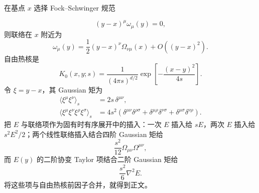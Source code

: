 \begin{derivation}
在基点 $x$ 选择 Fock--Schwinger 规范

\begin{equation*}
 (y-x)^\mu\omega_\mu(y)=0,
\end{equation*}
则联络在 $x$ 附近为
\begin{equation*}
 \omega_\mu(y)
 =\frac12(y-x)^\nu\Omega_{\nu\mu}(x)
 +O((y-x)^2).
\end{equation*}
自由热核是
\begin{equation*}
 K_0(x,y;s)=\frac1{(4\pi s)^{d/2}}
 \exp\!\left[-\frac{(x-y)^2}{4s}\right].
\end{equation*}
令 $\xi=y-x$，其 Gaussian 矩为
\begin{align*}
 \langle\xi^\mu\xi^\nu\rangle_s
 &=2s\,\delta^{\mu\nu},\\
 \langle\xi^\mu\xi^\nu\xi^\rho\xi^\sigma\rangle_s
 &=4s^2(\delta^{\mu\nu}\delta^{\rho\sigma}
 +\delta^{\mu\rho}\delta^{\nu\sigma}
 +\delta^{\mu\sigma}\delta^{\nu\rho}).
\end{align*}
把 $E$ 与联络项作为固有时有序展开中的插入：一次 $E$ 插入给 $sE$，两次 $E$ 插入给 $s^2E^2/2$；两个线性联络插入结合四阶 Gaussian 矩给
\begin{equation*}
 \frac{s^2}{12}\Omega_{\mu\nu}\Omega^{\mu\nu},
\end{equation*}
而 $E(y)$ 的二阶协变 Taylor 项结合二阶 Gaussian 矩给
\begin{equation*}
 \frac{s^2}{6}\nabla^2E.
\end{equation*}
将这些项与自由热核前因子合并，就得到正文。
\end{derivation}

